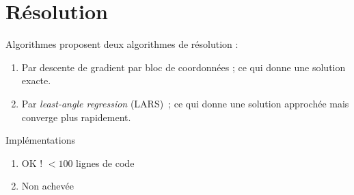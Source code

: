 \documentclass{beamer}
\theoremstyle{definition}
\begin{document}
\section{Résolution}
	\begin{frame}[allowframebreaks]{\insertsection}
		\begin{block}{Algorithmes}
			\citet{gfl} proposent deux algorithmes de résolution :
			\begin{enumerate}
				\item Par descente de gradient par bloc de coordonnées ; ce qui donne une solution exacte.
				\item Par \textit{least-angle regression} (LARS) ; ce qui donne une solution approchée mais converge plus rapidement.
			\end{enumerate}
		\end{block}
	
		\begin{block}{Implémentations}
			\begin{enumerate}
				\item OK ! $<100$ lignes de code
				\item Non achevée
			\end{enumerate}
		\end{block}
	\end{frame}
\end{document}
